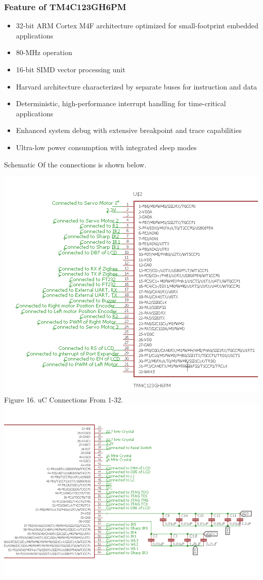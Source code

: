 \documentclass[a4paper,10pt,oneside]{article}
\begin{document}
{{	\subsubsection{\textbf{Feature of TM4C123GH6PM}}
		\begin{itemize}
			\item 32-bit ARM Cortex M4F architecture optimized for small-footprint embedded applications
			\item 80-MHz operation
			\item 16-bit SIMD vector processing unit
			\item Harvard architecture characterized by separate buses for instruction and data
			\item Deterministic, high-performance interrupt handling for time-critical applications
			\item Enhanced system debug with extensive breakpoint and trace capabilities
			\item Ultra-low power consumption with integrated sleep modes
		\end{itemize}
	Schematic Of the connections is shown below.}
	\begin{center}
		\includegraphics{Images/uc1}\\
		Figure 16. uC Connections From 1-32.\\
		\includegraphics{Images/uc2}\\

\end{center}}
\end{document}
